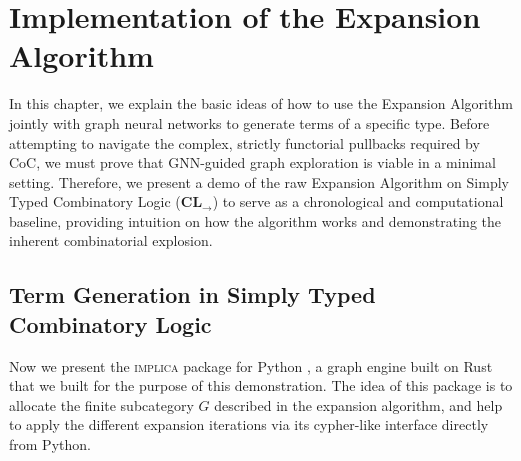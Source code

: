 \chapter{Implementation of the Expansion Algorithm}

In this chapter, we explain the basic ideas of how to use the Expansion Algorithm 
jointly with graph neural networks to generate terms of a specific type. Before attempting to 
navigate the complex, strictly functorial pullbacks required by CoC, we must prove that 
GNN-guided graph exploration is viable in a minimal setting. Therefore, we present a demo 
of the raw Expansion Algorithm on Simply Typed Combinatory Logic ($\textbf{CL}_{\rightarrow}$) to 
serve as a chronological and computational baseline, providing intuition on how the algorithm works
and demonstrating the inherent combinatorial explosion.

\section{Term Generation in Simply Typed Combinatory Logic} \label{sect:implica}

Now we present the \textsc{implica} package for Python \cite{fernandez}, a graph engine built on Rust
that we built for the purpose of this demonstration.
The idea of this package is to allocate the finite subcategory $G$ described in the expansion algorithm,
and help to apply the different expansion iterations via its cypher-like interface
directly from Python.

